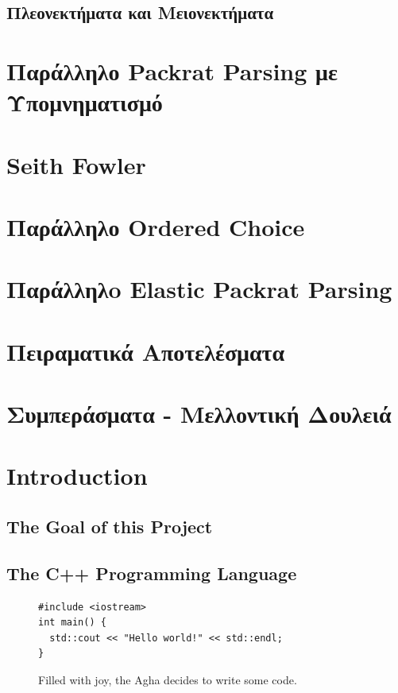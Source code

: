 \documentclass[diploma]{softlab-thesis}
\begin{document}
\section{Πλεονεκτήματα και Μειονεκτήματα}
\chapter{ Παράλληλο Packrat Parsing με Υπομνηματισμό }

\chapter{ Seith Fowler}

\chapter{ Παράλληλο Ordered Choice }

\chapter{ Παράλληλo Elastic Packrat Parsing }

\chapter{  Πειραματικά Αποτελέσματα }

\chapter{ Συμπεράσματα - Μελλοντική Δουλειά }

\englishtext

\chapter{Introduction}

\section{The Goal of this Project}

\section{The C++ Programming Language}


\begin{figure}[t]
\setlength\partopsep{-\topsep}%
\begin{verbatim}
#include <iostream>
int main() {
  std::cout << "Hello world!" << std::endl;
}
\end{verbatim}
\caption{Filled with joy, the Agha decides to write some code.%
  \label{fig:hello-english}}
\end{figure}
\end{document}
